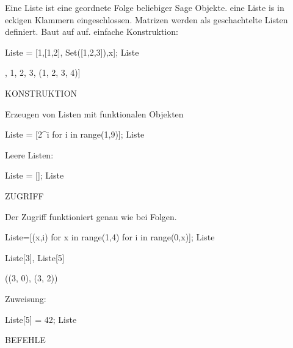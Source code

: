 \documentclass[fontsize=12pt,paper=a4,twoside,bibtotoc,idxtotoc,
liststotoc,pagesize,BCOR1.2cm,DIV15,chapterprefix,pagesize=pdftex]{scrbook}
\theoremstyle{plain}
\theoremstyle{definition}
\theoremstyle{remark}
\begin{document}
 Eine Liste ist eine geordnete Folge beliebiger Sage Objekte.
 eine Liste is in eckigen Klammern eingeschlossen.
 Matrizen werden als geschachtelte Listen definiert.
 Baut auf  auf.
 einfache Konstruktion:
\begin{sagein}
Liste = [1,[1,2], Set([1,2,3]),x]; Liste
\end{sagein}
\begin{sage}
[1, [1, 2], {1, 2, 3}, (1, 2, 3, 4)]
\end{sage}



KONSTRUKTION


 Erzeugen von Listen mit funktionalen Objekten
\begin{sagein}
Liste = [2^i for i in range(1,9)]; Liste
\end{sagein}
\begin{sage}
[2, 4, 8, 16, 32, 64, 128, 256]
\end{sage}
 Leere Listen:
\begin{sagein}
Liste = []; Liste
\end{sagein}
\begin{sage}
  []
\end{sage}


ZUGRIFF


 Der Zugriff funktioniert genau wie bei Folgen.
\begin{sagein}
Liste=[(x,i) for x in range(1,4) for i in range(0,x)];  Liste
\end{sagein}
\begin{sage}
[(1, 0), (2, 0), (2, 1), (3, 0), (3, 1), (3, 2)]
\end{sage}
\begin{sagein}
Liste[3], Liste[5]
\end{sagein}
\begin{sage}
((3, 0), (3, 2))
\end{sage}
 Zuweisung:
\begin{sagein}
Liste[5] = 42; Liste
\end{sagein}
\begin{sage}
  [(1, 0), (2, 0), (2, 1), (3, 0), (3, 1), 42]
\end{sage}


BEFEHLE
\end{document}
